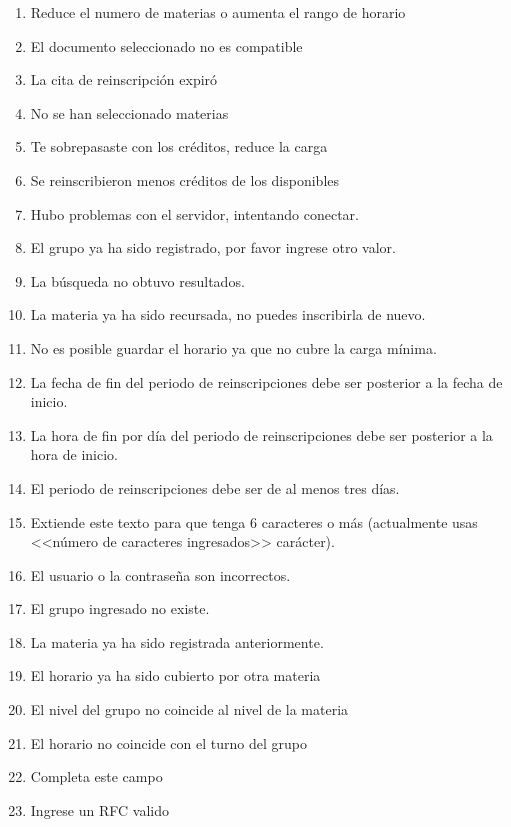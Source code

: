 \begin{enumerate}[{ME} 1.]
\item Reduce el numero de materias o aumenta el rango de horario
\item El documento seleccionado no es compatible
\item La cita de reinscripción expiró
\item No se han seleccionado materias
\item Te sobrepasaste con los créditos, reduce la carga
\item Se reinscribieron menos créditos de los disponibles
\item Hubo problemas con el servidor, intentando conectar.
\item El grupo ya ha sido registrado, por favor ingrese otro valor.
\item La búsqueda no obtuvo resultados.
\item La materia ya ha sido recursada, no puedes inscribirla de nuevo.
\item No es posible guardar el horario ya que no cubre la carga mínima.
\item La fecha de fin del periodo de reinscripciones debe ser posterior a la fecha de inicio.
\item La hora de fin por día del periodo de reinscripciones debe ser posterior a la hora de inicio.
\item El periodo de reinscripciones debe ser de al menos tres días.
\item Extiende este texto para que tenga 6 caracteres o más (actualmente usas <<número de caracteres ingresados>> carácter).
\item El usuario o la contraseña son incorrectos.
\item El grupo ingresado no existe.
\item La materia ya ha sido registrada anteriormente.
\item El horario ya ha sido cubierto por otra materia
\item El nivel del grupo no coincide al nivel de la materia
\item El horario no coincide con el turno del grupo
\item Completa este campo
\item Ingrese un RFC valido
\end{enumerate}